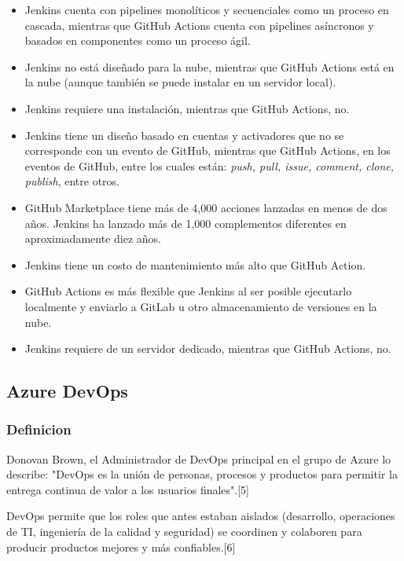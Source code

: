 \documentclass[twoside,twocolumn]{article}
\begin{document}
\begin{itemize}
    \item Jenkins cuenta con pipelines monolíticos y secuenciales como un proceso en cascada, mientras que GitHub Actions cuenta con pipelines asíncronos y basados en componentes como un proceso ágil.
    \item Jenkins no está diseñado para la nube, mientras que GitHub Actions está en la nube (aunque también se puede instalar en un servidor local).
    \item Jenkins requiere una instalación, mientras que GitHub Actions, no.
    \item Jenkins tiene un diseño basado en cuentas y activadores que no se corresponde con un evento de GitHub, mientras que GitHub Actions, en los eventos de GitHub, entre los cuales están: \textit{push, pull, issue, comment, clone, publish}, entre otros.
    \item GitHub Marketplace tiene más de 4,000 acciones lanzadas en menos de dos años. Jenkins ha lanzado más de 1,000 complementos diferentes en aproximadamente diez años.
    \item Jenkins tiene un costo de mantenimiento más alto que GitHub Action.
    \item GitHub Actions es más flexible que Jenkins al ser posible ejecutarlo localmente y enviarlo a GitLab u otro almacenamiento de versiones en la nube.
    \item Jenkins requiere de un servidor dedicado, mientras que GitHub Actions, no.
\end{itemize}

\subsection{Azure DevOps}

\subsubsection{Definicion}

Donovan Brown, el Administrador de DevOps principal en el grupo de Azure lo describe: "DevOps es la unión de personas, procesos y productos para permitir la entrega continua de valor a los usuarios finales".[5]

DevOps permite que los roles que antes estaban aislados (desarrollo, operaciones de TI, ingeniería de la calidad y seguridad) se coordinen y colaboren para producir productos mejores y más confiables.[6]
\end{document}
